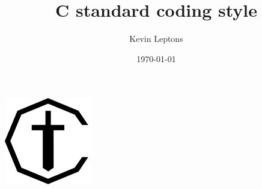 \documentclass[]{book}
\title{C standard coding style}
\author{Kevin Leptons}
\date{\today}
\begin{document}
\clearpage
\thispagestyle{empty}
\begin{center}
\Huge\@title

\@author

\@date

\includegraphics[width=1.5in]{img/cstyle.png}
\end{center}

\frontmatter
\maketitle
\tableofcontents

\mainmatter














\appendix

\backmatter

\end{document}
